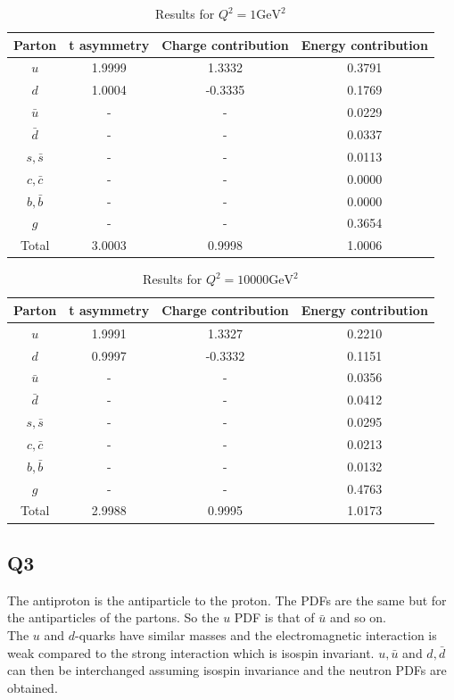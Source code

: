 \documentclass[a4paper,10pt]{article}
\begin{document}
 \begin{table}[ht]
\caption{Results for $Q^2=1 \mathrm{GeV}^2$}
\label{q1}
\centering %
\begin{tabular}{cccc} %
\hline
Parton & t asymmetry & Charge contribution & Energy contribution\\
\hline
$u$ & 1.9999 & 1.3332 & 0.3791 \\
$d$ & 1.0004 & -0.3335 & 0.1769 \\
$\bar{u}$ & - & - & 0.0229\\
$\bar{d}$ & - & - & 0.0337\\
$s, \bar{s}$ & - & - & 0.0113\\
$c, \bar{c}$ & - & - & 0.0000\\
$b, \bar{b}$ & - & - & 0.0000\\
$g$ & - & - & 0.3654\\
Total & 3.0003 & 0.9998 & 1.0006
\end{tabular}
\end{table}

 \begin{table}[ht]
\caption{Results for $Q^2=10000 \mathrm{GeV}^2$}
\label{q10000}
\centering %
\begin{tabular}{cccc} %
\hline
Parton & t asymmetry & Charge contribution & Energy contribution\\
\hline
$u$ & 1.9991 & 1.3327 & 0.2210 \\
$d$ & 0.9997 & -0.3332 & 0.1151 \\
$\bar{u}$ & - & - & 0.0356\\
$\bar{d}$ & - & - & 0.0412\\
$s, \bar{s}$ & - & - & 0.0295\\
$c, \bar{c}$ & - & - & 0.0213\\
$b, \bar{b}$ & - & - & 0.0132\\
$g$ & - & - & 0.4763\\
Total & 2.9988 & 0.9995 & 1.0173
\end{tabular}
\end{table}
\subsection{Q3}
The antiproton is the antiparticle to the proton. The PDFs are the same but for the antiparticles of the partons. So the $u$ PDF is that of $\bar{u}$ and so on.\\
The $u$ and $d$-quarks have similar masses and the electromagnetic interaction is weak compared to the strong interaction which is isospin invariant. $u, \bar{u}$ and $d, \bar{d}$ can then be interchanged assuming isospin invariance and the neutron PDFs are obtained.
\end{document}
